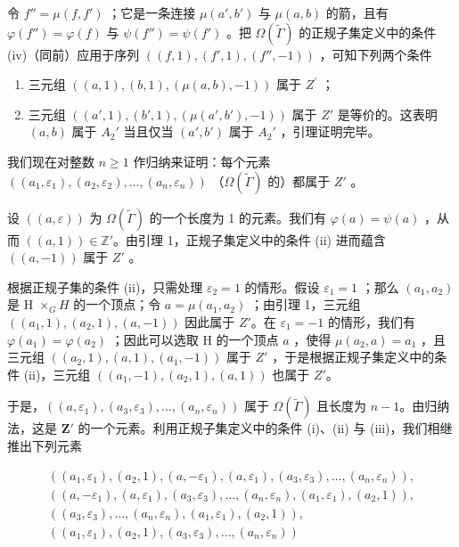 令 \(f'' = \mu(f, f')\) ；它是一条连接 \(\mu(a', b')\) 与 \(\mu(a, b)\) 的箭，且有 \(\varphi(f'') = \varphi(f)\) 与 \(\psi(f'') = \psi(f')\) 。把 \(\Omega(\widetilde{\Gamma})\) 的正规子集定义中的条件 (iv)（同前）应用于序列 \(((f, 1), (f', 1), (f'', -1))\) ，可知下列两个条件

\begin{enumerate}
\def\labelenumi{(\roman{enumi})}
\item
  三元组 \(((a,1),(b,1),(\mu (a,b), - 1))\) 属于 \(Z^{\prime}\) ；
\item
  三元组 \(((a',1),(b',1),(\mu(a',b'),-1))\) 属于 \(Z'\) 是等价的。这表明 \((a,b)\) 属于 \(A_{2}'\) 当且仅当 \((a',b')\) 属于 \(A_{2}'\) ，引理证明完毕。
\end{enumerate}

我们现在对整数 \(n \geqslant 1\) 作归纳来证明：每个元素 \(((a_1, \varepsilon_1), (a_2, \varepsilon_2), \ldots, (a_n, \varepsilon_n))\) （\(\Omega(\widetilde{\Gamma})\) 的）都属于 \(Z'\) 。


设 \(((a,\varepsilon))\) 为 \(\Omega(\tilde{\Gamma})\) 的一个长度为 1 的元素。我们有 \(\varphi(a)=\psi(a)\) ，从而 \(((a,1))\in\mathbb{Z}'\)。由引理 1，正规子集定义中的条件 (ii) 进而蕴含 \(((a,-1))\) 属于 \(Z'\) 。


根据正规子集的条件 (ii)，只需处理 \(\varepsilon_{2}=1\) 的情形。假设 \(\varepsilon_{1}=1\) ；那么 \((a_{1},a_{2})\) 是 H \(\times_{G}H\) 的一个顶点；令 \(a=\mu(a_{1},a_{2})\) ；由引理 1，三元组 \(((a_{1},1),(a_{2},1),(a,-1))\) 因此属于 \(Z'\)。在 \(\varepsilon_{1}=-1\) 的情形，我们有 \(\varphi(a_{1})=\varphi(a_{2})\) ；因此可以选取 H 的一个顶点 \(a\) ，使得 \(\mu(a_{2},a)=a_{1}\) ，且三元组 \(((a_{2},1),(a,1),(a_{1},-1))\) 属于 \(Z'\) ，于是根据正规子集定义中的条件 (ii)，三元组 \(((a_{1},-1),(a_{2},1),(a,1))\) 也属于 \(Z'\)。

于是，\(((a,\varepsilon_1),(a_3,\varepsilon_3),\ldots ,(a_n,\varepsilon_n))\) 属于 \(\Omega (\widetilde{\Gamma})\) 且长度为 \(n - 1\)。由归纳法，这是 \(\mathbf{Z}'\) 的一个元素。利用正规子集定义中的条件 (i)、(ii) 与 (iii)，我们相继推出下列元素

\[
\begin{array}{c} ((a _ {1}, \varepsilon_ {1}), (a _ {2}, 1), (a, - \varepsilon_ {1}), (a, \varepsilon_ {1}), (a _ {3}, \varepsilon_ {3}), \ldots , (a _ {n}, \varepsilon_ {n})), \\ ((a, - \varepsilon_ {1}), (a, \varepsilon_ {1}), (a _ {3}, \varepsilon_ {3}), \ldots , (a _ {n}, \varepsilon_ {n}), (a _ {1}, \varepsilon_ {1}), (a _ {2}, 1)), \\ ((a _ {3}, \varepsilon_ {3}), \ldots , (a _ {n}, \varepsilon_ {n}), (a _ {1}, \varepsilon_ {1}), (a _ {2}, 1)), \\ ((a _ {1}, \varepsilon_ {1}), (a _ {2}, 1), (a _ {3}, \varepsilon_ {3}), \ldots , (a _ {n}, \varepsilon_ {n})) \end{array}
\]

